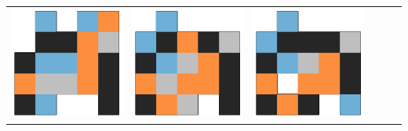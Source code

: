 \begin{tabular}{cccccc}
    \includegraphics[scale=0.1]{images/top_designs/pusher/ga/exp1/gen29_ind3} &
    \includegraphics[scale=0.1]{images/top_designs/pusher/ga/exp1/gen29_ind4} &
    \includegraphics[scale=0.1]{images/top_designs/pusher/ga/exp1/gen29_ind5} \\

\end{tabular}
